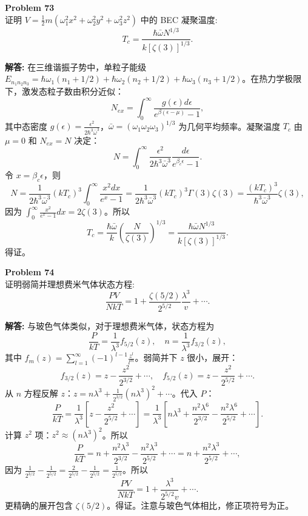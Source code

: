 \documentclass[12pt, a4paper, oneside]{ctexart}
\newenvironment{solution}{\par\noindent\textbf{解答:}\quad}{\par}
\begin{document}
\begin{mdframed}[backgroundcolor=gray!10, linewidth=0pt]
    \textbf{Problem 73} \\
    证明 $V = \frac{1}{2} m (\omega_1^2 x^2 + \omega_2^2 y^2 + \omega_3^2 z^2)$ 中的 BEC 凝聚温度:
    \[
    T_c = \frac{\hbar \bar{\omega} N^{1/3}}{k [\zeta(3)]^{1/3}}.
    \]
\end{mdframed}
\begin{solution}
    在三维谐振子势中，单粒子能级 $E_{n_1 n_2 n_3} = \hbar \omega_1 (n_1 + 1/2) + \hbar \omega_2 (n_2 + 1/2) + \hbar \omega_3 (n_3 + 1/2)$。在热力学极限下，激发态粒子数由积分近似：
    \[
    N_{ex} = \int_0^\infty \frac{g(\epsilon) d\epsilon}{e^{\beta (\epsilon - \mu)} - 1},
    \]
    其中态密度 $g(\epsilon) = \frac{\epsilon^2}{2 \hbar^3 \bar{\omega}^3}$，$\bar{\omega} = (\omega_1 \omega_2 \omega_3)^{1/3}$ 为几何平均频率。凝聚温度 $T_c$ 由 $\mu = 0$ 和 $N_{ex} = N$ 决定：
    \[
    N = \int_0^\infty \frac{\epsilon^2}{2 \hbar^3 \bar{\omega}^3} \frac{d\epsilon}{e^{\beta_c \epsilon} - 1}.
    \]
    令 $x = \beta_c \epsilon$，则
    \[
    N = \frac{1}{2 \hbar^3 \bar{\omega}^3} (kT_c)^3 \int_0^\infty \frac{x^2 dx}{e^x - 1} = \frac{1}{2 \hbar^3 \bar{\omega}^3} (kT_c)^3 \Gamma(3) \zeta(3) = \frac{(kT_c)^3}{\hbar^3 \bar{\omega}^3} \zeta(3),
    \]
    因为 $\int_0^\infty \frac{x^2}{e^x-1} dx = 2 \zeta(3)$。所以
    \[
    T_c = \frac{\hbar \bar{\omega}}{k} \left( \frac{N}{\zeta(3)} \right)^{1/3} = \frac{\hbar \bar{\omega} N^{1/3}}{k [\zeta(3)]^{1/3}}.
    \]
    得证。
\end{solution}

\begin{mdframed}[backgroundcolor=gray!10, linewidth=0pt]
    \textbf{Problem 74} \\
    证明弱简并理想费米气体状态方程:
    \[
    \frac{P V}{N k T} = 1 + \frac{\zeta(5/2)}{2^{5/2}} \frac{\lambda^3}{v} + \cdots.
    \]
\end{mdframed}
\begin{solution}
    与玻色气体类似，对于理想费米气体，状态方程为
    \[
    \frac{P}{kT} = \frac{1}{\lambda^3} f_{5/2}(z), \quad n = \frac{1}{\lambda^3} f_{3/2}(z),
    \]
    其中 $f_{m}(z) = \sum_{l=1}^\infty (-1)^{l-1} \frac{z^l}{l^m}$。弱简并下 $z$ 很小，展开：
    \[
    f_{3/2}(z) = z - \frac{z^2}{2^{3/2}} + \cdots, \quad f_{5/2}(z) = z - \frac{z^2}{2^{5/2}} + \cdots.
    \]
    从 $n$ 方程反解 $z$：$z = n \lambda^3 + \frac{1}{2^{3/2}} (n \lambda^3)^2 + \cdots$。代入 $P$：
    \[
    \frac{P}{kT} = \frac{1}{\lambda^3} \left[ z - \frac{z^2}{2^{5/2}} + \cdots \right] = \frac{1}{\lambda^3} \left[ n \lambda^3 + \frac{n^2 \lambda^6}{2^{3/2}} - \frac{n^2 \lambda^6}{2^{5/2}} + \cdots \right].
    \]
    计算 $z^2$ 项：$z^2 \approx (n \lambda^3)^2$。所以
    \[
    \frac{P}{kT} = n + \frac{n^2 \lambda^3}{2^{3/2}} - \frac{n^2 \lambda^3}{2^{5/2}} + \cdots = n + \frac{n^2 \lambda^3}{2^{5/2}} + \cdots,
    \]
    因为 $\frac{1}{2^{3/2}} - \frac{1}{2^{5/2}} = \frac{2}{2^{5/2}} - \frac{1}{2^{5/2}} = \frac{1}{2^{5/2}}$。所以
    \[
    \frac{P V}{N k T} = 1 + \frac{\lambda^3}{2^{5/2} v} + \cdots.
    \]
    更精确的展开包含 $\zeta(5/2)$。得证。注意与玻色气体相比，修正项符号为正。
\end{solution}
\end{document}

